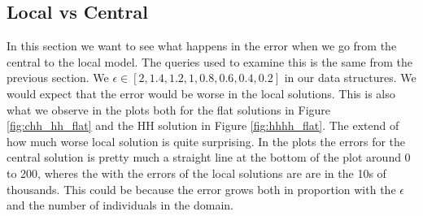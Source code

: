 \documentclass[11pt]{article}
\theoremstyle{definition}
\begin{document}
\newpage\subsection{Local vs Central}
In this section we want to see what happens in the error when we go from the central to the local model. The queries used to examine this is the same from the previous section. We $\epsilon\in[2, 1.4, 1.2, 1, 0.8, 0.6, 0.4, 0.2]$ in our data structures. We would expect that the error would be worse in the local solutions. This is also what we observe in the plots both for the flat solutions in Figure \ref{fig:chh_hh_flat} and the HH solution in Figure \ref{fig:hhhh_flat}. The extend of how much worse local solution is quite surprising. In the plots the errors for the central solution is pretty much a straight line at the bottom of the plot around 0 to 200, wheres the with the errors of the local solutions are are in the 10s of thousands. This could be because the error grows both in proportion with the $\epsilon$ and the number of individuals in the domain.
\end{document}
